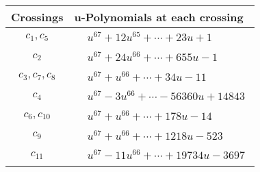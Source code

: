 \documentclass[1p]{elsarticle_modified}
\theoremstyle{definition}
\begin{document}
\begin{tabular}{m{50pt}|m{274pt}}
Crossings & \hspace{64pt}u-Polynomials at each crossing \\
\hline $$\begin{aligned}c_{1},c_{5}\end{aligned}$$&$\begin{aligned}
&u^{67}+12 u^{65}+\cdots+23 u+1
\end{aligned}$\\
\hline $$\begin{aligned}c_{2}\end{aligned}$$&$\begin{aligned}
&u^{67}+24 u^{66}+\cdots+655 u-1
\end{aligned}$\\
\hline $$\begin{aligned}c_{3},c_{7},c_{8}\end{aligned}$$&$\begin{aligned}
&u^{67}+u^{66}+\cdots+34 u-11
\end{aligned}$\\
\hline $$\begin{aligned}c_{4}\end{aligned}$$&$\begin{aligned}
&u^{67}-3 u^{66}+\cdots-56360 u+14843
\end{aligned}$\\
\hline $$\begin{aligned}c_{6},c_{10}\end{aligned}$$&$\begin{aligned}
&u^{67}+u^{66}+\cdots+178 u-14
\end{aligned}$\\
\hline $$\begin{aligned}c_{9}\end{aligned}$$&$\begin{aligned}
&u^{67}+u^{66}+\cdots+1218 u-523
\end{aligned}$\\
\hline $$\begin{aligned}c_{11}\end{aligned}$$&$\begin{aligned}
&u^{67}-11 u^{66}+\cdots+19734 u-3697
\end{aligned}$\\
\hline
\end{tabular}\\~\\
\newpage\renewcommand{\arraystretch}{1}
\end{document}
